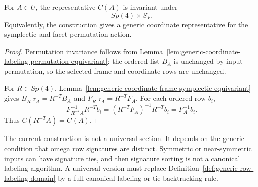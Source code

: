 \begin{proposition}
\label{prop:generic-coordinate-canonization}
For \(A\in U\), the representative \(C(A)\) is invariant under
\[
  Sp(4)\times S_F.
\]
Equivalently, the construction gives a generic coordinate representative for
the symplectic and facet-permutation action.
\end{proposition}

\begin{proof}
Permutation invariance follows from
Lemma~\ref{lem:generic-coordinate-labeling-permutation-equivariant}: the ordered
list \(B_A\) is unchanged by input permutation, so the selected frame and
coordinate rows are unchanged.

For \(R\in Sp(4)\), Lemma~\ref{lem:generic-coordinate-frame-symplectic-equivariant}
gives \(B_{R^{-T}A}=R^{-T}B_A\) and \(F_{R^{-T}A}=R^{-T}F_A\). For each ordered
row \(b_i\),
\[
  F_{R^{-T}A}^{-1}R^{-T}b_i
  =(R^{-T}F_A)^{-1}R^{-T}b_i
  =F_A^{-1}b_i.
\]
Thus \(C(R^{-T}A)=C(A)\).
\end{proof}

\begin{remark}
\label{rem:generic-coordinate-canonization-not-universal}
The current construction is not a universal section. It depends on the generic
condition that omega row signatures are distinct. Symmetric or near-symmetric
inputs can have signature ties, and then signature sorting is not a canonical
labeling algorithm. A universal version must replace
Definition~\ref{def:generic-row-labeling-domain} by a full canonical-labeling
or tie-backtracking rule.
\end{remark}
